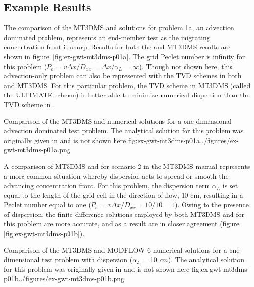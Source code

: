 

\subsection{Example Results}

The comparison of the MT3DMS and \mf solutions for problem 1a, an advection dominated problem, represents an end-member test as the migrating concentration front is sharp. Results for both the \mf and MT3DMS results are shown in figure~\ref{fig:ex-gwt-mt3dms-p01a}.  The grid Peclet number is infinity for this problem ($P_e$ = $v\Delta x/D_{xx}$ = $\Delta x$/$\alpha_L$ = $\infty$).  Though not shown here, this advection-only problem can also be represented with the TVD schemes in both \mf and MT3DMS.  For this particular problem, the TVD scheme in MT3DMS (called the ULTIMATE scheme) is better able to minimize numerical dispersion than the TVD scheme in \mf.

\begin{StandardFigure}
	{Comparison of the MT3DMS and \mf numerical solutions for a one-dimensional advection dominated test problem.  The analytical solution for this problem was originally given in \cite{vanGenuchtenAlves1982} and is not shown here}
	{fig:ex-gwt-mt3dms-p01a}{../figures/ex-gwt-mt3dms-p01a.png}
\end{StandardFigure}

A comparison of MT3DMS and \mf for scenario 2 in the MT3DMS manual represents a more common situation whereby dispersion acts to spread or smooth the advancing concentration front.  For this problem, the dispersion term $\alpha_L$ is set equal to the length of the grid cell in the direction of flow, 10 cm, resulting in a Peclet number equal to one ($P_e$ = $v\Delta x/D_{xx} = 10/10 = 1$).  Owing to the presence of dispersion, the finite-difference solutions employed by both MT3DMS and \mf for this problem are more accurate, and as a result are in closer agreement (figure \ref{fig:ex-gwt-mt3dms-p01b}).

\begin{StandardFigure}
	{Comparison of the MT3DMS and MODFLOW 6 numerical solutions for a one-dimensional test problem with dispersion ($\alpha_L$ = 10 $cm$).  The analytical solution for this problem was originally given in \cite{vanGenuchtenAlves1982} and is not shown here}
	{fig:ex-gwt-mt3dms-p01b}{../figures/ex-gwt-mt3dms-p01b.png}
\end{StandardFigure}

